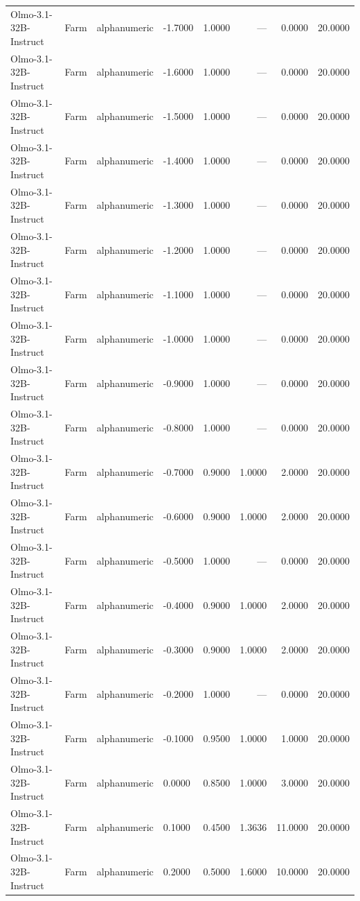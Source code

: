 \begin{table}
\begin{tabular}{llllrrrr}
Olmo-3.1-32B-Instruct & Farm & alphanumeric & -1.7000 & 1.0000 & --- & 0.0000 & 20.0000 \\
Olmo-3.1-32B-Instruct & Farm & alphanumeric & -1.6000 & 1.0000 & --- & 0.0000 & 20.0000 \\
Olmo-3.1-32B-Instruct & Farm & alphanumeric & -1.5000 & 1.0000 & --- & 0.0000 & 20.0000 \\
Olmo-3.1-32B-Instruct & Farm & alphanumeric & -1.4000 & 1.0000 & --- & 0.0000 & 20.0000 \\
Olmo-3.1-32B-Instruct & Farm & alphanumeric & -1.3000 & 1.0000 & --- & 0.0000 & 20.0000 \\
Olmo-3.1-32B-Instruct & Farm & alphanumeric & -1.2000 & 1.0000 & --- & 0.0000 & 20.0000 \\
Olmo-3.1-32B-Instruct & Farm & alphanumeric & -1.1000 & 1.0000 & --- & 0.0000 & 20.0000 \\
Olmo-3.1-32B-Instruct & Farm & alphanumeric & -1.0000 & 1.0000 & --- & 0.0000 & 20.0000 \\
Olmo-3.1-32B-Instruct & Farm & alphanumeric & -0.9000 & 1.0000 & --- & 0.0000 & 20.0000 \\
Olmo-3.1-32B-Instruct & Farm & alphanumeric & -0.8000 & 1.0000 & --- & 0.0000 & 20.0000 \\
Olmo-3.1-32B-Instruct & Farm & alphanumeric & -0.7000 & 0.9000 & 1.0000 & 2.0000 & 20.0000 \\
Olmo-3.1-32B-Instruct & Farm & alphanumeric & -0.6000 & 0.9000 & 1.0000 & 2.0000 & 20.0000 \\
Olmo-3.1-32B-Instruct & Farm & alphanumeric & -0.5000 & 1.0000 & --- & 0.0000 & 20.0000 \\
Olmo-3.1-32B-Instruct & Farm & alphanumeric & -0.4000 & 0.9000 & 1.0000 & 2.0000 & 20.0000 \\
Olmo-3.1-32B-Instruct & Farm & alphanumeric & -0.3000 & 0.9000 & 1.0000 & 2.0000 & 20.0000 \\
Olmo-3.1-32B-Instruct & Farm & alphanumeric & -0.2000 & 1.0000 & --- & 0.0000 & 20.0000 \\
Olmo-3.1-32B-Instruct & Farm & alphanumeric & -0.1000 & 0.9500 & 1.0000 & 1.0000 & 20.0000 \\
Olmo-3.1-32B-Instruct & Farm & alphanumeric & 0.0000 & 0.8500 & 1.0000 & 3.0000 & 20.0000 \\
Olmo-3.1-32B-Instruct & Farm & alphanumeric & 0.1000 & 0.4500 & 1.3636 & 11.0000 & 20.0000 \\
Olmo-3.1-32B-Instruct & Farm & alphanumeric & 0.2000 & 0.5000 & 1.6000 & 10.0000 & 20.0000 \\

\end{tabular}
\end{table}

